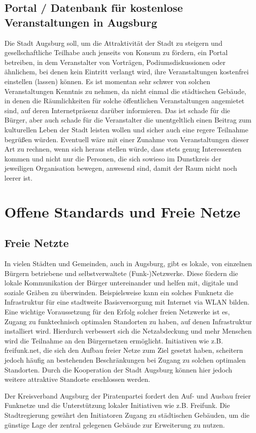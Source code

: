 \documentclass[a5paper, ngerman, 10pt]{scrbook}
\begin{document}
   \section{Portal / Datenbank für kostenlose Veranstaltungen in Augsburg}
   
   Die Stadt Augsburg soll, um die Attraktivität der Stadt zu steigern und 
   gesellschaftliche Teilhabe auch jenseits von Konsum zu fördern, ein Portal 
   betreiben, in dem Veranstalter von Vorträgen, Podiumsdiskussionen oder 
   ähnlichem, bei denen kein Eintritt verlangt wird, ihre Veranstaltungen 
   kostenfrei einstellen (lassen) können. Es ist momentan sehr schwer von 
   solchen Veranstaltungen Kenntnis zu nehmen, da nicht einmal die städtischen 
   Gebäude, in denen die Räumlichkeiten für solche öffentlichen 
   Veranstaltungen angemietet sind, auf deren Internetpräsenz darüber 
   informieren. Das ist schade für die Bürger, aber auch schade für die 
   Veranstalter die unentgeltlich einen Beitrag zum kulturellen Leben der 
   Stadt leisten wollen und sicher auch eine regere Teilnahme begrüßen würden. 
   Eventuell wäre mit einer Zunahme von Veranstaltungen dieser Art zu rechnen, 
   wenn sich heraus stellen würde, dass stets genug Interessenten kommen und 
   nicht nur die Personen, die sich sowieso im Dunstkreis der jeweiligen 
   Organisation bewegen, anwesend sind, damit der Raum nicht noch leerer ist. 


  \chapter{Offene Standards und Freie Netze}
  
  \section{Freie Netzte}
  
  In vielen Städten und Gemeinden, auch in Augsburg, gibt es lokale, von 
  einzelnen Bürgern betriebene und selbstverwaltete (Funk-)Netzwerke. Diese 
  fördern die lokale Kommunikation der Bürger untereinander und helfen mit, 
  digitale und soziale Gräben zu überwinden. Beispielsweise kann ein solches 
  Funknetz die Infrastruktur für eine stadtweite Basisversorgung mit Internet 
  via WLAN bilden. Eine wichtige Voraussetzung für den Erfolg solcher freien 
  Netzwerke ist es, Zugang zu funktechnisch optimalen Standorten zu haben, auf 
  denen Infrastruktur installiert wird. Hierdurch verbessert sich die 
  Netzabdeckung und mehr Menschen wird die Teilnahme an den Bürgernetzen 
  ermöglicht. Initiativen wie z.B. freifunk.net, die sich den Aufbau freier 
  Netze zum Ziel gesetzt haben, scheitern jedoch häufig an bestehenden 
  Beschränkungen bei Zugang zu solchen optimalen Standorten. Durch die 
  Kooperation der Stadt Augsburg können hier jedoch weitere attraktive 
  Standorte erschlossen werden.
  
  Der Kreisverband Augsburg der Piratenpartei fordert den Auf- und Ausbau 
  freier Funknetze und die Unterstützung lokaler Initiativen wie z.B. 
  Freifunk. Die Stadtregierung gewährt den Initiatoren Zugang zu 
  städtischen Gebäuden, um die günstige Lage der zentral gelegenen Gebäude zur 
  Erweiterung zu nutzen. 
\end{document}
